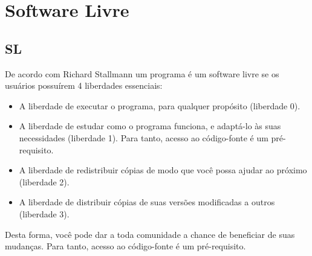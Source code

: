 \chapter{Software Livre}
\label{cap-software-livre}

\section{SL}

%
De acordo com Richard Stallmann  um programa é um software livre se os usuários possuírem 4 liberdades essenciais:
\begin{itemize}
\item A liberdade de executar o programa, para qualquer propósito (liberdade 0).
\item A liberdade de estudar como o programa funciona, e adaptá-lo às suas necessidades (liberdade 1). Para tanto, acesso ao código-fonte é um pré-requisito.
\item A liberdade de redistribuir cópias de modo que você possa ajudar ao próximo (liberdade 2).
\item A liberdade de distribuir cópias de suas versões modificadas a outros (liberdade 3).
\end{itemize}

Desta forma, você pode dar a toda comunidade a chance de beneficiar de suas mudanças. Para tanto, acesso ao código-fonte é um pré-requisito.